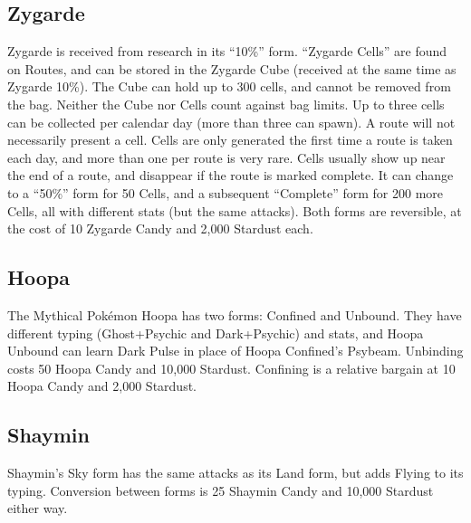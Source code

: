 \subsection{Zygarde\label{sec:zygarde}}
Zygarde is received from research in its ``10\%'' form.
``Zygarde Cells'' are found on Routes, and can be stored in the Zygarde Cube
 (received at the same time as Zygarde 10\%).
The Cube can hold up to 300 cells, and cannot be removed from the bag.
Neither the Cube nor Cells count against bag limits.
Up to three cells can be collected per calendar day (more than three can spawn).
A route will not necessarily present a cell.
Cells are only generated the first time a route is taken each day, and more than one per route is very rare.
Cells usually show up near the end of a route, and disappear if the route is marked complete.
It can change to a ``50\%'' form for 50 Cells, and a subsequent ``Complete''
 form for 200 more Cells, all with different stats (but the same attacks).
Both forms are reversible, at the cost of 10 Zygarde Candy and 2,000 Stardust each.

\subsection{Hoopa\label{subsec:hoopa}}
The Mythical Pokémon Hoopa has two forms: Confined and Unbound.
They have different typing (Ghost+Psychic and Dark+Psychic) and stats,
  and Hoopa Unbound can learn Dark Pulse in place of Hoopa Confined's Psybeam.
Unbinding costs 50 Hoopa Candy and 10,000 Stardust.
Confining is a relative bargain at 10 Hoopa Candy and 2,000 Stardust.

\subsection{Shaymin}
Shaymin's Sky form has the same attacks as its Land form, but adds Flying to its typing.
Conversion between forms is 25 Shaymin Candy and 10,000 Stardust either way.

